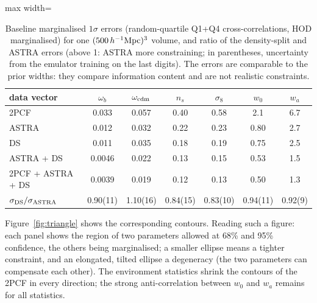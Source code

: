 \begin{table}[!htbp]
\centering\small
\begin{adjustbox}{max width=\linewidth}
\begin{tabular}{lcccccc}
\toprule
data vector & $\omega_b$ & $\omega_{\rm cdm}$ & $n_s$ & $\sigma_8$ & $w_0$ & $w_a$ \\
\midrule
2PCF & 0.033 & 0.057 & 0.40 & 0.58 & 2.1 & 6.7 \\
ASTRA & 0.012 & 0.032 & 0.22 & 0.23 & 0.80 & 2.7 \\
DS & 0.011 & 0.035 & 0.18 & 0.19 & 0.75 & 2.5 \\
ASTRA + DS & 0.0046 & 0.022 & 0.13 & 0.15 & 0.53 & 1.5 \\
2PCF + ASTRA + DS & 0.0039 & 0.019 & 0.12 & 0.13 & 0.50 & 1.3 \\
\midrule
$\sigma_{\rm DS}/\sigma_{\rm ASTRA}$ & 0.90(11) & 1.10(16) & 0.84(15) & 0.83(10) & 0.94(11) & 0.92(9) \\
\bottomrule
\end{tabular}
\end{adjustbox}
\caption{Baseline marginalised $1\sigma$ errors (random-quartile Q1+Q4 cross-correlations, HOD marginalised) for one $(500\,h^{-1}\mathrm{Mpc})^3$ volume, and ratio of the density-split and ASTRA errors (above 1: ASTRA more constraining; in parentheses, uncertainty from the emulator training on the last digits). The errors are comparable to the prior widths: they compare information content and are not realistic constraints.}
\label{tab:sigma}
\end{table}

Figure~\ref{fig:triangle} shows the corresponding contours. Reading such a figure: each panel shows the region of two parameters allowed at 68\% and 95\% confidence, the others being marginalised; a smaller ellipse means a tighter constraint, and an elongated, tilted ellipse a degeneracy (the two parameters can compensate each other). The environment statistics shrink the contours of the 2PCF in every direction; the strong anti-correlation between $w_0$ and $w_a$ remains for all statistics.

